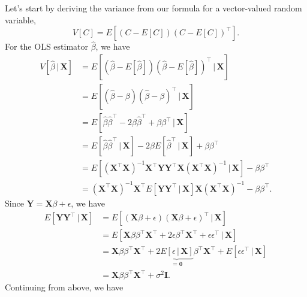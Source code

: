 \documentclass[
  12pt,
  oneside,openany]{book}
\begin{document}
Let's start by deriving the variance from our formula for a vector-valued random variable,
\[
V[C] = E \left[ (C - E[C]) (C - E[C])^\top \right].
\]
For the OLS estimator \(\hat{\beta}\), we have
\[
\begin{aligned}
  V[\hat{\beta} \,|\, \mathbf{X}]
  &= E \left[ \left(\hat{\beta} - E[\hat{\beta}]\right) \left(\hat{\beta} - E[\hat{\beta}]\right)^\top \,|\, \mathbf{X} \right] \\
  &= E \left[ \left(\hat{\beta} - \beta\right) \left(\hat{\beta} - \beta\right)^\top \,|\, \mathbf{X} \right] \\
  &= E \left[ \hat{\beta} \hat{\beta}^\top - 2 \beta \hat{\beta}^\top + \beta \beta^\top \,|\, \mathbf{X} \right] \\
  &= E \left[ \hat{\beta} \hat{\beta}^\top \,|\, \mathbf{X} \right] - 2 \beta E \left[ \hat{\beta}^\top \,|\, \mathbf{X} \right] + \beta \beta^\top \\
  &= E \left[ (\mathbf{X}^\top \mathbf{X})^{-1} \mathbf{X}^\top \mathbf{Y} \mathbf{Y}^\top \mathbf{X} (\mathbf{X}^\top \mathbf{X})^{-1} \,|\, \mathbf{X} \right] - \beta \beta^\top \\
  &= (\mathbf{X}^\top \mathbf{X})^{-1} \mathbf{X}^\top E \left[ \mathbf{Y} \mathbf{Y}^\top \,|\, \mathbf{X} \right] \mathbf{X} (\mathbf{X}^\top \mathbf{X})^{-1} - \beta \beta^\top.
\end{aligned}
\]
Since \(\mathbf{Y} = \mathbf{X} \beta + \epsilon\), we have
\[
\begin{aligned}
  E \left[ \mathbf{Y} \mathbf{Y}^\top \,|\, \mathbf{X} \right]
  &= E \left[ (\mathbf{X} \beta + \epsilon) (\mathbf{X} \beta + \epsilon)^\top \,|\, \mathbf{X} \right] \\
  &= E \left[ \mathbf{X} \beta \beta^\top \mathbf{X}^\top + 2 \epsilon \beta^\top \mathbf{X}^\top + \epsilon \epsilon^\top \,|\, \mathbf{X} \right] \\
  &= \mathbf{X} \beta \beta^\top \mathbf{X}^\top + 2 \underbrace{E[\epsilon \,|\, \mathbf{X}]}_{= \mathbf{0}} \beta^\top \mathbf{X}^\top + E[\epsilon \epsilon^\top \,|\, \mathbf{X}] \\
  &= \mathbf{X} \beta \beta^\top \mathbf{X}^\top + \sigma^2 \mathbf{I}.
\end{aligned}
\]
Continuing from above, we have
\end{document}
